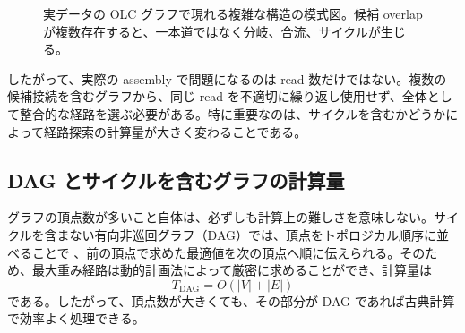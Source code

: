 \documentclass[a4j,10pt]{ujarticle}
\begin{document}
\begin{figure}[tbp]
\centering
{}

\caption{
実データの OLC グラフで現れる複雑な構造の模式図。候補 overlap が複数存在すると、一本道ではなく分岐、合流、サイクルが生じる。
}
\label{fig:olc_complex}
\end{figure}

したがって、実際の assembly で問題になるのは read 数だけではない。複数の候補接続を含むグラフから、同じ read を不適切に繰り返し使用せず、全体として整合的な経路を選ぶ必要がある。特に重要なのは、サイクルを含むかどうかによって経路探索の計算量が大きく変わることである。


\subsection{DAG とサイクルを含むグラフの計算量}

グラフの頂点数が多いこと自体は、必ずしも計算上の難しさを意味しない。サイクルを含まない有向非巡回グラフ（DAG）では、頂点をトポロジカル順序に並べることで \cite{kahn1962topological}、前の頂点で求めた最適値を次の頂点へ順に伝えられる。そのため、最大重み経路は動的計画法によって厳密に求めることができ、計算量は
\[
T_{\mathrm{DAG}}=O(|V|+|E|)
\]
である。したがって、頂点数が大きくても、その部分が DAG であれば古典計算で効率よく処理できる。
\end{document}

